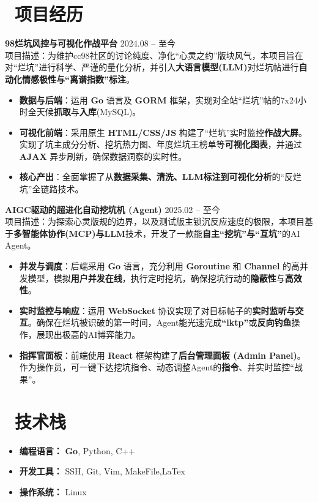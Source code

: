 \documentclass[11pt]{article}
\begin{document}
\section{\makebox[\widthof{\faUsers}][c]{\color{CVBlue}\faUsers}\ 项目经历}


\textbf{98烂坑风控与可视化作战平台} \hfill 2024.08 -- 至今 \\
项目描述：为维护cc98社区的讨论纯度、净化“心灵之约”版块风气，本项目旨在对“烂坑”进行科学、严谨的量化分析，并引入\textbf{大语言模型(LLM)}对烂坑帖进行\textbf{自动化情感极性与“离谱指数”标注}。
\begin{itemize}[nosep]
    \item \textbf{数据与后端}：运用 \textbf{Go} 语言及 \textbf{GORM} 框架，实现对全站“烂坑”帖的7x24小时全天候\textbf{抓取}与\textbf{入库}(MySQL)。
    \item \textbf{可视化前端}：采用原生 \textbf{HTML/CSS/JS} 构建了“烂坑”实时监控\textbf{作战大屏}。实现了坑主成分分析、挖坑热力图、年度烂坑王榜单等\textbf{可视化图表}，并通过 \textbf{AJAX} 异步刷新，确保数据洞察的实时性。
    \item \textbf{核心产出}：全面掌握了从\textbf{数据采集、清洗、LLM标注到可视化分析}的“反烂坑”全链路技术。
\end{itemize}

\vspace{0.3em} %

\textbf{AIGC驱动的超进化自动挖坑机 (Agent)} \hfill 2025.02 -- 至今 \\
项目描述：为探索心灵版规的边界，以及测试版主锁沉反应速度的极限，本项目基于\textbf{多智能体协作(MCP)与LLM}技术，开发了一款能\textbf{自主“挖坑”与“互坑”}的AI Agent。
\begin{itemize}[nosep]
    \item \textbf{并发与调度}：后端采用 \textbf{Go} 语言，充分利用 \textbf{Goroutine} 和 \textbf{Channel} 的高并发模型，模拟\textbf{用户并发在线}，执行定时挖坑，确保挖坑行动的\textbf{隐蔽性}与\textbf{高效性}。
    \item \textbf{实时监控与响应}：运用 \textbf{WebSocket} 协议实现了对目标帖子的\textbf{实时监听与交互}。确保在烂坑被识破的第一时间，Agent能光速完成\textbf{“lktp”}或\textbf{反向钓鱼}操作，展现出极高的AI博弈能力。
    \item \textbf{指挥官面板}：前端使用 \textbf{React} 框架构建了\textbf{后台管理面板 (Admin Panel)}。作为操作员，可一键下达挖坑指令、动态调整Agent的\textbf{指令}、并实时监控“战果”。
\end{itemize}

\section{\makebox[\widthof{\faCogs}][c]{\color{CVBlue}\faCogs}\ 技术栈}
\begin{itemize}[nosep]
    \item \textbf{编程语言：} \textbf{Go}, Python, C++
    \item \textbf{开发工具：} SSH, Git, Vim, MakeFile,LaTex
    \item \textbf{操作系统：} Linux
\end{itemize}
\end{document}
